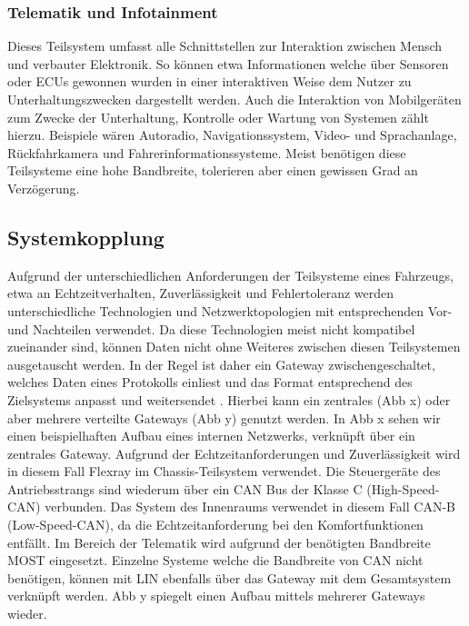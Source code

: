         \subsubsection{Telematik und Infotainment}
        Dieses Teilsystem umfasst alle Schnittstellen zur Interaktion zwischen Mensch und verbauter Elektronik. So können etwa Informationen welche über Sensoren
        oder ECUs gewonnen wurden in einer interaktiven Weise dem Nutzer zu Unterhaltungszwecken dargestellt werden. Auch die Interaktion von Mobilgeräten
        zum Zwecke der Unterhaltung, Kontrolle oder Wartung von Systemen zählt hierzu. Beispiele wären Autoradio, Navigationssystem, Video- und Sprachanlage, Rückfahrkamera und Fahrerinformationssysteme.
        Meist benötigen diese Teilsysteme eine hohe Bandbreite, tolerieren aber einen gewissen Grad an Verzögerung.
    \subsection{Systemkopplung}
    Aufgrund der unterschiedlichen Anforderungen der Teilsysteme eines Fahrzeugs, etwa an Echtzeitverhalten, Zuverlässigkeit und Fehlertoleranz werden unterschiedliche Technologien
    und Netzwerktopologien mit entsprechenden Vor- und Nachteilen verwendet. Da diese Technologien meist nicht kompatibel zueinander sind, können Daten nicht ohne Weiteres zwischen diesen
    Teilsystemen ausgetauscht werden. In der Regel ist daher ein Gateway zwischengeschaltet, welches Daten eines Protokolls einliest und das Format entsprechend des Zielsystems anpasst
    und weitersendet \cite{reif2011bosch}\cite{TW_kim2014gateway}. Hierbei kann ein zentrales (Abb x) oder aber mehrere verteilte Gateways (Abb y) genutzt werden. 
    In Abb x sehen wir einen beispielhaften Aufbau eines internen Netzwerks, verknüpft über ein zentrales Gateway. Aufgrund der Echtzeitanforderungen und Zuverlässigkeit wird in diesem Fall Flexray
    im Chassis-Teilsystem verwendet. Die Steuergeräte des Antriebsstrangs sind wiederum über ein CAN Bus der Klasse C (High-Speed-CAN) verbunden. Das System des Innenraums verwendet in diesem Fall 
    CAN-B (Low-Speed-CAN), da die Echtzeitanforderung bei den Komfortfunktionen entfällt. Im Bereich der Telematik wird aufgrund der benötigten Bandbreite MOST eingesetzt. Einzelne Systeme welche die
    Bandbreite von CAN nicht benötigen, können mit LIN ebenfalls über das Gateway mit dem Gesamtsystem verknüpft werden.
    Abb y spiegelt einen Aufbau mittels mehrerer Gateways wieder.
